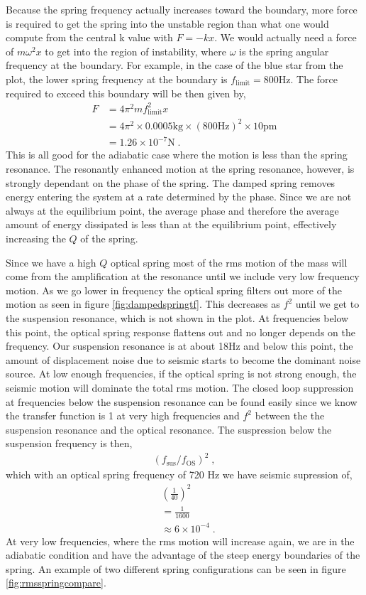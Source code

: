 Because the spring frequency actually increases toward the boundary, more force
is required to get the spring into the unstable region than what one would
compute from the central k value with $F=-kx$.
We would actually need a force of $m\omega^2 x$ to get into the region of
instability, where $\omega$ is the spring angular frequency at the boundary.
For example, in the case of the blue star from the plot, the lower spring
frequency at the boundary is $f_\mathrm{limit} = 800\mathrm{Hz}$.
The force required to exceed this boundary will be then given by,
\begin{align*}
F &= 4\pi^2mf_\mathrm{limit}^2x \\
  &= 4\pi^2 \times 0.0005 \mathrm{kg} \times (800\mathrm{Hz})^2 \times 10
     \mathrm{pm} \\
  &= 1.26 \times 10^{-7} \mathrm{N} \;.
\end{align*}
This is all good for the adiabatic case where the motion is less than the spring
resonance.
The resonantly enhanced motion at the spring resonance, however, is strongly
dependant on the phase of the spring.
The damped spring removes energy entering the system at a rate determined by
the phase.
Since we are not always at the equilibrium point, the average phase and
therefore the average amount of energy dissipated is less than at the
equilibrium point, effectively increasing the $Q$ of the spring.

Since we have a high $Q$ optical spring most of the \ac{rms} motion of the mass
will come from the amplification at the resonance until we include very low
frequency motion.
As we go lower in frequency the optical spring filters out more of the motion
as seen in figure \ref{fig:dampedspringtf}.
This decreases as $f^2$ until we get to the suspension resonance, which is not
shown in the plot.
At frequencies below this point, the optical spring response flattens out
and no longer depends on the frequency.
Our suspension resonance is at about 18Hz and below this point, the amount
of displacement noise due to seismic starts to become the dominant noise
source.
At low enough frequencies, if the optical spring is not strong enough, the
seismic motion will dominate the total \ac{rms} motion.
The closed loop suppression at frequencies below the suspension resonance can
be found easily since we know the transfer function is 1 at very high
frequencies and $f^2$ between the the suspension resonance and the optical
resonance.
The suspression below the suspension frequency is then,
\begin{align}
\left( f_\mathrm{sus}/f_\mathrm{OS} \right)^2 \;,
\end{align}
which with an optical spring frequency of 720 Hz we have seismic supression of,
\begin{align*}
& \left(\frac{1}{40}\right)^2 \\
&= \frac{1}{1600} \\
&\approx 6\times 10^{-4} \;.
\end{align*}
At very low frequencies, where the \ac{rms} motion will increase again, we are
in the adiabatic condition and have the advantage of the steep energy
boundaries of the spring. An example of two different spring configurations can
be seen in figure \ref{fig:rmsspringcompare}.

